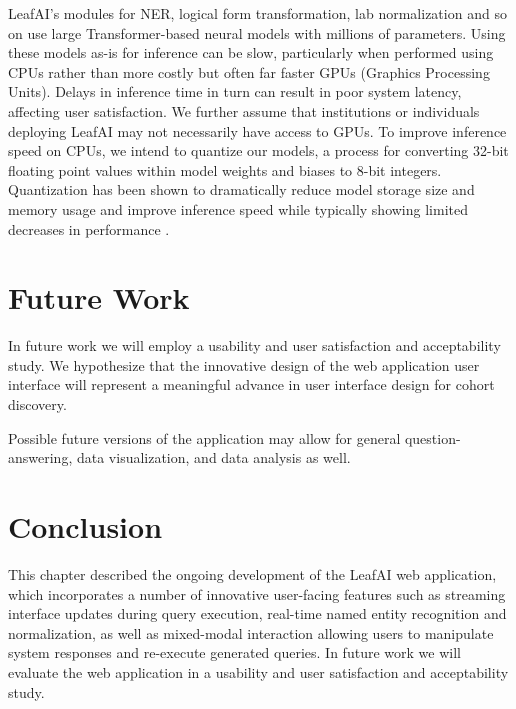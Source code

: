 \documentclass[../main.tex]{subfiles}
\begin{document}
LeafAI's modules for NER, logical form transformation, lab normalization and so on use large Transformer-based neural models \cite{vaswani2017attention} with millions of parameters. Using these models as-is for inference can be slow, particularly when performed using CPUs rather than more costly but often far faster GPUs (Graphics Processing Units). Delays in inference time in turn can result in poor system latency, affecting user satisfaction. We further assume that institutions or individuals deploying LeafAI may not necessarily have access to GPUs. To improve inference speed on CPUs, we intend to quantize our models, a process for converting 32-bit floating point values within model weights and biases to 8-bit integers. Quantization has been shown to dramatically reduce model storage size and memory usage and improve inference speed while typically showing limited decreases in performance \cite{hubara2017quantized}. 

\section{Future Work}

In future work we will employ a usability and user satisfaction and acceptability study. We hypothesize that the innovative design of the web application user interface will represent a meaningful advance in user interface design for cohort discovery.

Possible future versions of the application may allow for general question-answering, data visualization, and data analysis as well.

\section{Conclusion}

This chapter described the ongoing development of the LeafAI web application, which incorporates a number of innovative user-facing features such as streaming interface updates during query execution, real-time named entity recognition and normalization, as well as mixed-modal interaction allowing users to manipulate system responses and re-execute generated queries. In future work we will evaluate the web application in a usability and user satisfaction and acceptability study.
\end{document}
